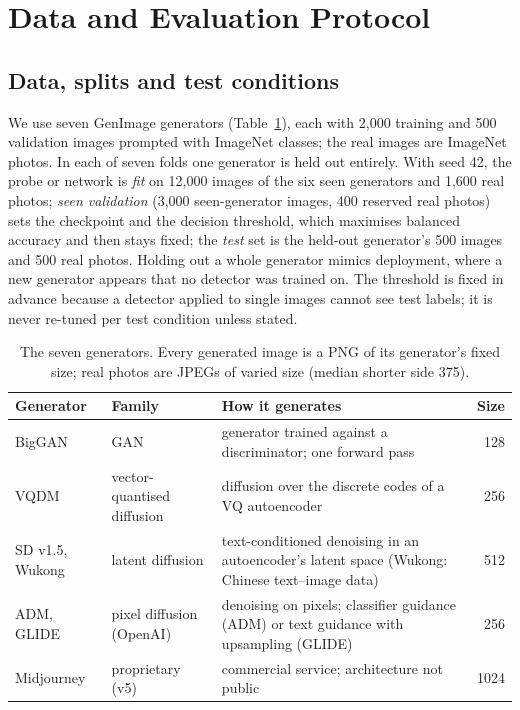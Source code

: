 \documentclass[10pt,a4paper]{article}
\begin{document}
\section{Data and Evaluation Protocol}\label{sec:protocol}

\subsection{Data, splits and test conditions}
We use seven GenImage generators (Table~\ref{tab:generators}), each with 2,000 training and 500 validation images prompted with ImageNet classes; the real images are ImageNet photos. In each of seven folds one generator is held out entirely. With seed 42, the probe or network is \emph{fit} on 12,000 images of the six seen generators and 1,600 real photos; \emph{seen validation} (3,000 seen-generator images, 400 reserved real photos) sets the checkpoint and the decision threshold, which maximises balanced accuracy and then stays fixed; the \emph{test} set is the held-out generator's 500 images and 500 real photos. Holding out a whole generator mimics deployment, where a new generator appears that no detector was trained on. The threshold is fixed in advance because a detector applied to single images cannot see test labels; it is never re-tuned per test condition unless stated.

\begin{table}[h]
\centering\footnotesize
\caption{The seven generators. Every generated image is a PNG of its generator's fixed size; real photos are JPEGs of varied size (median shorter side 375).}\label{tab:generators}
\begin{tabularx}{\textwidth}{@{}l>{\raggedright\arraybackslash}p{3.2cm}>{\raggedright\arraybackslash}X r@{}}
\toprule
Generator & Family & How it generates & Size \\
\midrule
BigGAN & GAN & generator trained against a discriminator; one forward pass & 128 \\
VQDM & vector-quantised diffusion & diffusion over the discrete codes of a VQ autoencoder & 256 \\
SD v1.5, Wukong & latent diffusion & text-conditioned denoising in an autoencoder's latent space (Wukong: Chinese text--image data) & 512 \\
ADM, GLIDE & pixel diffusion (OpenAI) & denoising on pixels; classifier guidance (ADM) or text guidance with upsampling (GLIDE) & 256 \\
Midjourney & proprietary (v5) & commercial service; architecture not public & 1024 \\
\bottomrule
\end{tabularx}
\end{table}
\end{document}
